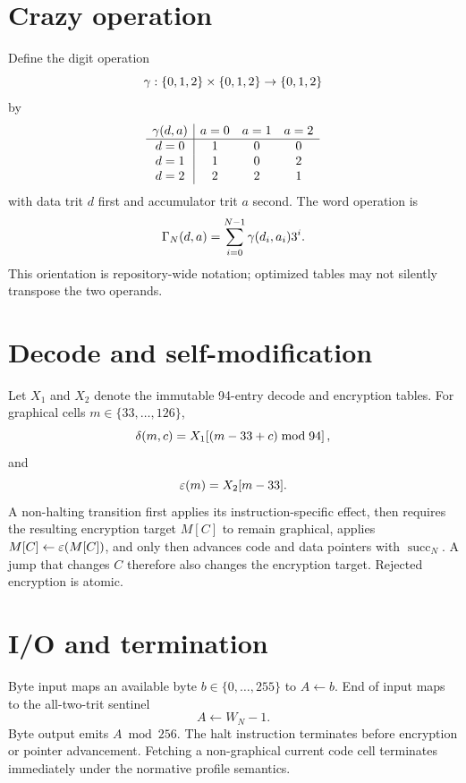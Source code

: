\documentclass{article}
\begin{document}
\section{Crazy operation}

Define the digit operation
\[
  \gamma : \{0,1,2\}\times\{0,1,2\}\to\{0,1,2\}
\]
by
\[
\begin{array}{c|ccc}
\gamma(d,a) & a=0 & a=1 & a=2 \\
\hline
 d=0 & 1 & 0 & 0 \\
 d=1 & 1 & 0 & 2 \\
 d=2 & 2 & 2 & 1
\end{array}
\]
with data trit $d$ first and accumulator trit $a$ second. The word operation is
\begin{equation}
  \Gamma_{N}\!\left(d,a\right)
    = \sum_{i=0}^{N-1}\gamma(d_i,a_i)3^i.
  \label{eq:profile-crazy}
\end{equation}
This orientation is repository-wide notation; optimized tables may not silently
transpose the two operands.

\section{Decode and self-modification}

Let $X_1$ and $X_2$ denote the immutable 94-entry decode and encryption tables.
For graphical cells $m\in\{33,\ldots,126\}$,
\begin{equation}
  \delta(m,c)
    = X_1\!\left[(m-33+c)\bmod 94\right],
  \label{eq:profile-decode}
\end{equation}
and
\begin{equation}
  \varepsilon(m)=X_2[m-33].
  \label{eq:profile-encrypt}
\end{equation}
A non-halting transition first applies its instruction-specific effect, then
requires the resulting encryption target $M[C]$ to remain graphical, applies
$M[C]\leftarrow\varepsilon(M[C])$, and only then advances code and data pointers
with $\operatorname{succ}_N$. A jump that changes $C$ therefore also changes the
encryption target. Rejected encryption is atomic.

\section{I/O and termination}

Byte input maps an available byte $b\in\{0,\ldots,255\}$ to $A\leftarrow b$.
End of input maps to the all-two-trit sentinel
\begin{equation}
  A\leftarrow W_N-1.
  \label{eq:profile-eof}
\end{equation}
Byte output emits $A\bmod256$. The halt instruction terminates before encryption
or pointer advancement. Fetching a non-graphical current code cell terminates
immediately under the normative profile semantics.
\end{document}
